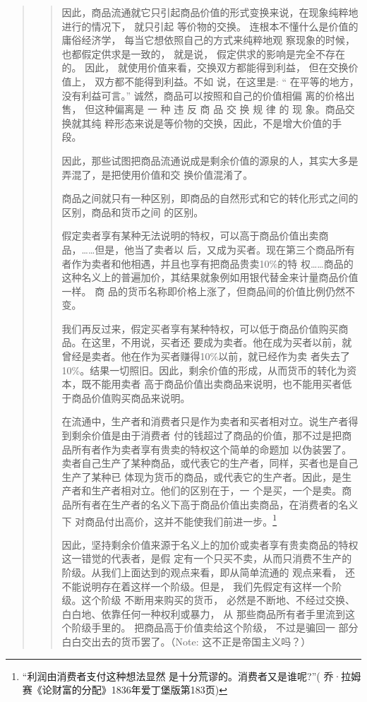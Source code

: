 \begin{quotation}
\begin{quotation}
因此，商品流通就它只引起商品价值的形式变换来说，在现象纯粹地进行的情况下， 就只引起
等价物的交换。 连根本不懂什么是价值的庸俗经济学， 每当它想依照自己的方式来纯粹地观
察现象的时候，也都假定供求是一致的， 就是说， 假定供求的影响是完全不存在的。 因此，
就使用价值来看，交换双方都能得到利益， 但在交换价值上， 双方都不能得到利益。不如
说，在这里是: “ 在平等的地方， 没有利益可言。” 诚然，商品可以按照和自己的价值相偏
离的价格出售， 但这种偏离是 一 种 违 反 商 品 交 换 规 律 的 现 象。商品交换就其纯
粹形态来说是等价物的交换，因此，不是增大价值的手段。

因此，那些试图把商品流通说成是剩余价值的源泉的人，其实大多是弄混了，是把使用价值和交
换价值混淆了。 

商品之间就只有一种区别，即商品的自然形式和它的转化形式之间的区别，商品和货币之间
的区别。

假定卖者享有某种无法说明的特权，可以高于商品价值出卖商品，……但是，他当了卖者以
后，又成为买者。现在第三个商品所有者作为卖者和他相遇，并且也享有把商品贵卖10\%的特
权……商品的这种名义上的普遍加价，其结果就象例如用银代替金来计量商品价值一样。 商
品的货币名称即价格上涨了，但商品间的价值比例仍然不变。

我们再反过来，假定买者享有某种特权，可以低于商品价值购买商品。在这里，不用说，买者还
要成为卖者。他在成为买者以前，就曾经是卖者。他在作为买者赚得10\%以前，就已经作为卖
者失去了10\%。结果一切照旧。因此，剩余价值的形成，从而货币的转化为资本，既不能用卖者
高于商品价值出卖商品来说明，也不能用买者低于商品价值购买商品来说明。 

在流通中，生产者和消费者只是作为卖者和买者相对立。说生产者得到剩余价值是由于消费者
付的钱超过了商品的价值，那不过是把商品所有者作为卖者享有贵卖的特权这个简单的命题加
以伪装罢了。卖者自己生产了某种商品，或代表它的生产者，同样，买者也是自己生产了某种已
体现为货币的商品，或代表它的生产者。因此，是生产者和生产者相对立。他们的区别在于，一
个是买，一个是卖。商品所有者在生产者的名义下高于商品价值出卖商品，在消费者的名义下
对商品付出高价，这并不能使我们前进一步。\footnote{“利润由消费者支付这种想法显然
  是十分荒谬的。消费者又是谁呢?”( 乔·拉姆赛《论财富的分配》1836年爱丁堡版第183页)}

因此，坚持剩余价值来源于名义上的加价或卖者享有贵卖商品的特权这一错觉的代表者，是假
定有一个只买不卖，从而只消费不生产的阶级。从我们上面达到的观点来看，即从简单流通的
观点来看， 还不能说明存在着这样一个阶级。但是， 我们先假定有这样一个阶级。这个阶级
不断用来购买的货币， 必然是不断地、不经过交换、白白地、依靠任何一种权利或暴力， 从
那些商品所有者手里流到这个阶级手里的。 把商品高于价值卖给这个阶级， 不过是骗回一
部分白白交出去的货币罢了。（Note: 这不正是帝国主义吗？）



\end{quotation}
\end{quotation}
